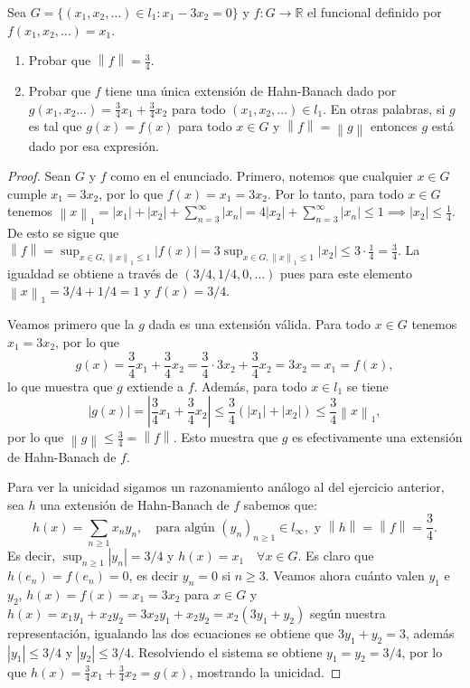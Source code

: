 \documentclass{article}
\theoremstyle{definition}
\newcommand{\R}{\mathbb{R}}
\newcommand{\norm}[1]{\left\lVert #1 \right\rVert}       %
\newenvironment{ejercicio}[1]{\begin{trivlist}
\item[\hskip \labelsep {\bfseries Ejercicio}\hskip \labelsep {\bfseries #1.}]}{\end{trivlist}}
\begin{document}
\begin{ejercicio}{5}
    Sea \(G=\{(x_1,x_2,\dots)\in l_{1}:x_{1}-3x_{2}=0\} \) y \(f:G\to\R \) el funcional definido por \( f(x_1, x_2, \ldots) = x_1 \).
    \begin{enumerate}
        \item Probar que \(\norm{f}=\frac{3}{4}\).
        \item Probar que \(f\) tiene una única extensión de Hahn-Banach dado por \(g(x_{1},x_{2}\dots)=\frac{3}{4}x_{1}+\frac{3}{4}x_{2}\) para todo \((x_{1},x_{2},\dots)\in l_{1}\). En otras palabras, si \(g\) es tal que \(g(x)=f(x)\) para todo \(x\in G\) y \(\norm{f}=\norm{g}\) entonces \(g\) está dado por esa expresión.
    \end{enumerate}
\end{ejercicio}
\begin{proof}
    Sean \( G \) y \( f \) como en el enunciado. Primero, notemos que cualquier \( x \in G \) cumple \( x_1 = 3x_2 \), por lo que \( f(x) = x_1 = 3x_2 \). Por lo tanto, para todo \( x \in G \) tenemos \( \norm{x}_1 = |x_1| + |x_2| + \sum_{n=3}^{\infty} |x_n| = 4|x_2| + \sum_{n=3}^{\infty} |x_n| \le 1 \implies |x_2| \le \frac{1}{4} \). De esto se sigue que \(\norm{f} = \sup_{x \in G, \norm{x}_1 \le 1} |f(x)| = 3 \sup_{x \in G, \norm{x}_1 \le 1} |x_2| \le 3 \cdot \frac{1}{4} = \frac{3}{4}\). La igualdad se obtiene a través de \( (3/4, 1/4, 0, \ldots) \) pues para este elemento \( \norm{x}_1 = 3/4 + 1/4 = 1 \) y \( f(x) = 3/4 \).

    Veamos primero que la \( g \) dada es una extensión válida. Para todo \( x \in G \) tenemos \( x_1 = 3x_2 \), por lo que
    \[
        g(x) = \frac{3}{4}x_1 + \frac{3}{4}x_2 = \frac{3}{4} \cdot 3x_2 + \frac{3}{4}x_2 = 3x_2 = x_1 = f(x),
    \]
    lo que muestra que \( g \) extiende a \( f \). Además, para todo \( x \in l_1 \) se tiene
    \[
        |g(x)| = \left|\frac{3}{4}x_1 + \frac{3}{4}x_2\right| \le \frac{3}{4}(|x_1| + |x_2|) \le \frac{3}{4} \norm{x}_1,
    \]
    por lo que \( \norm{g} \le \frac{3}{4} = \norm{f} \). Esto muestra que \( g \) es efectivamente una extensión de Hahn-Banach de \( f \).

    Para ver la unicidad sigamos un razonamiento análogo al del ejercicio anterior, sea \( h \) una extensión de Hahn-Banach de \( f \) sabemos que:\[
        h(x) = \sum_{n\ge1} x_n y_n, \quad \text{para algún } {(y_n)}_{n\ge1} \in l_\infty, \text{ y } \norm{h} = \norm{f} = \frac{3}{4}.
    \]
    Es decir, \( \sup_{n\ge1} |y_n| = 3/4 \) y \( h(x) = x_1 \quad \forall x \in G \). Es claro que \( h(e_n) = f(e_n) = 0 \), es decir \( y_n = 0 \) si \( n \ge 3 \). Veamos ahora cuánto valen \( y_1 \) e \( y_2 \), \( h(x) = f(x) = x_1 = 3x_2 \) para \( x \in G \) y \( h(x) = x_1 y_1 + x_2 y_2 = 3x_2 y_1 + x_2 y_2 = x_2 (3 y_1 + y_2) \) según nuestra representación, igualando las dos ecuaciones se obtiene que \( 3 y_1 + y_2 = 3 \), además \( |y_1| \le 3/4 \) y \( |y_2| \le 3/4 \). Resolviendo el sistema se obtiene \( y_1 = y_2 = 3/4 \), por lo que \( h(x) = \frac{3}{4}x_1 + \frac{3}{4}x_2 = g(x) \), mostrando la unicidad.
\end{proof}
\end{document}
